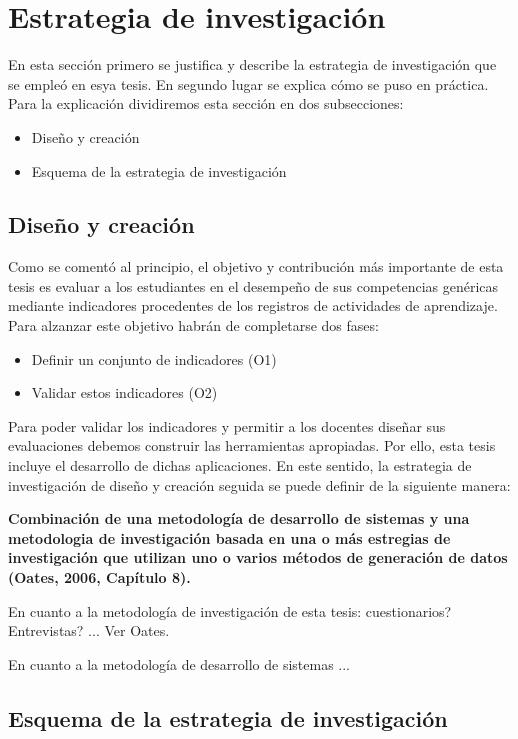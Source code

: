 
\section{Estrategia de investigación}
\label{sec:Estrategia}



En esta sección primero se justifica y describe la estrategia de investigación que se empleó en esya tesis. En segundo lugar se explica cómo se puso en práctica. Para la explicación dividiremos esta sección en dos subsecciones:

\begin{itemize}
\item Diseño y creación
\item Esquema de la estrategia de investigación
\end{itemize}

\subsection{Diseño y creación}

Como se comentó al principio, el objetivo y contribución más importante de esta tesis es evaluar a los estudiantes en el desempeño de sus competencias genéricas mediante indicadores procedentes de los registros de actividades de aprendizaje. Para alzanzar este objetivo habrán de completarse dos fases:

\begin{itemize}
\item Definir un conjunto de indicadores (O1)
\item Validar estos indicadores (O2)
\end{itemize}

Para poder validar los indicadores y permitir a los docentes diseñar sus evaluaciones debemos construir las herramientas apropiadas. Por ello, esta tesis incluye el desarrollo de dichas aplicaciones.  En este sentido, la estrategia de investigación de diseño y creación seguida se puede definir de la siguiente manera:

\bigskip
\textbf{Combinación de una metodología de desarrollo de sistemas y una metodologia de investigación basada en una o más estregias de investigación que utilizan uno o varios métodos de generación de datos (Oates, 2006, Capítulo 8).}
\bigskip


En cuanto a la metodología de investigación de esta tesis: cuestionarios? Entrevistas? ... Ver Oates.

\bigskip
En cuanto a la metodología de desarrollo de sistemas ...

\subsection{Esquema de la estrategia de investigación}
